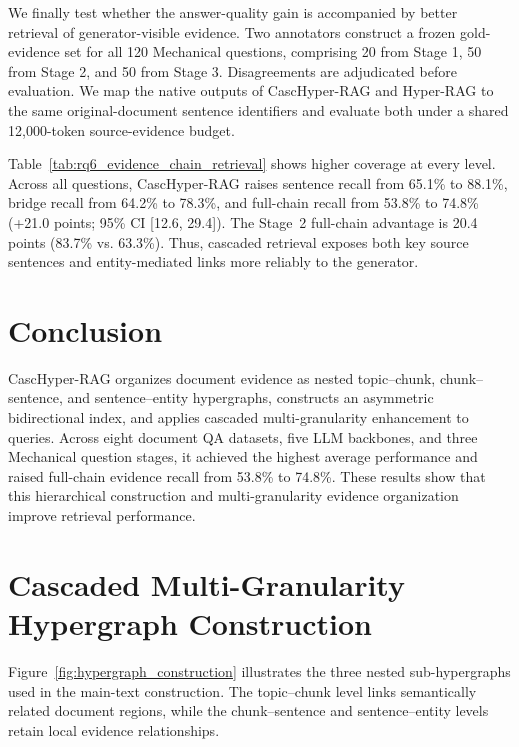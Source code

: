\documentclass{article} %
\begin{document}
We finally test whether the answer-quality gain is accompanied by better retrieval of generator-visible evidence. Two annotators construct a frozen gold-evidence set for all 120 Mechanical questions, comprising 20 from Stage 1, 50 from Stage 2, and 50 from Stage 3. Disagreements are adjudicated before evaluation. We map the native outputs of CascHyper-RAG and Hyper-RAG to the same original-document sentence identifiers and evaluate both under a shared 12,000-token source-evidence budget.

Table~\ref{tab:rq6_evidence_chain_retrieval} shows higher coverage at every level. Across all questions, CascHyper-RAG raises sentence recall from 65.1\% to 88.1\%, bridge recall from 64.2\% to 78.3\%, and full-chain recall from 53.8\% to 74.8\% (+21.0 points; 95\% CI [12.6, 29.4]). The Stage~2 full-chain advantage is 20.4 points (83.7\% vs. 63.3\%). Thus, cascaded retrieval exposes both key source sentences and entity-mediated links more reliably to the generator.

\par\WFclear
\section{Conclusion}\label{sec:conclusion}

CascHyper-RAG organizes document evidence as nested topic--chunk, chunk--sentence, and sentence--entity hypergraphs, constructs an asymmetric bidirectional index, and applies cascaded multi-granularity enhancement to queries. Across eight document QA datasets, five LLM backbones, and three Mechanical question stages, it achieved the highest average performance and raised full-chain evidence recall from 53.8\% to 74.8\%. These results show that this hierarchical construction and multi-granularity evidence organization improve retrieval performance.






\appendix
{}

\section{Cascaded Multi-Granularity Hypergraph Construction}
\label{app:cascaded_hypergraph_construction}

Figure~\ref{fig:hypergraph_construction} illustrates the three nested sub-hypergraphs used in the main-text construction. The topic--chunk level links semantically related document regions, while the chunk--sentence and sentence--entity levels retain local evidence relationships.
\end{document}

